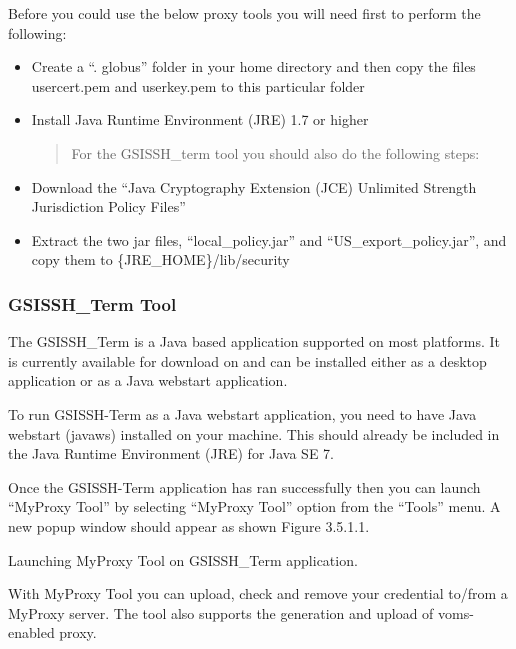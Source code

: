 \documentclass[english]{book}
\begin{document}
Before you could use the below proxy tools you will need first to
perform the following:
\begin{itemize}
\item {} 
Create a “. globus” folder in your home directory and then copy the
files usercert.pem and userkey.pem to this particular folder

\item {} 
Install Java Runtime Environment (JRE) 1.7 or higher
\begin{quote}

For the GSISSH\_term tool you should also do the following steps:
\end{quote}

\item {} 
Download the “Java Cryptography Extension (JCE) Unlimited Strength
Jurisdiction Policy Files”

\item {} 
Extract the two jar files, “local\_policy.jar” and
“US\_export\_policy.jar”, and copy them to \{JRE\_HOME\}/lib/security

\end{itemize}


\subsubsection{GSISSH\_Term Tool}
\label{\detokenize{Section3:gsissh-term-tool}}
The GSISSH\_Term is a Java based application supported on most
platforms. It is currently available for download on
and can be installed either as a desktop application or as a Java
webstart application.

To run GSISSH-Term as a Java webstart application, you need to have Java
webstart (javaws) installed on your machine. This should already be
included in the Java Runtime Environment (JRE) for Java SE 7.

Once the GSISSH-Term application has ran successfully then you can
launch “MyProxy Tool” by selecting “MyProxy Tool” option from the
“Tools” menu. A new popup window should appear as shown Figure 3.5.1.1.


 Launching MyProxy Tool on GSISSH\_Term
application.

With MyProxy Tool you can upload, check and remove your credential
to/from a MyProxy server. The tool also supports the generation and
upload of voms-enabled proxy.
\end{document}
